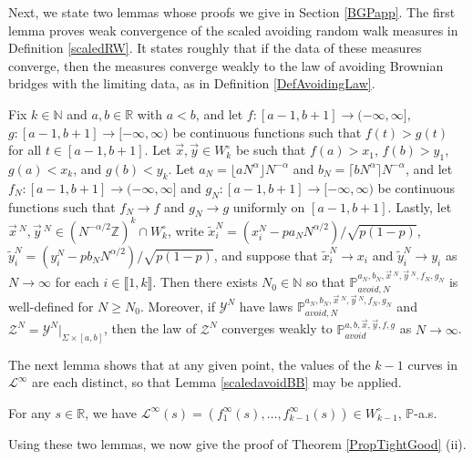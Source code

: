 Next, we state two lemmas whose proofs we give in Section \ref{BGPapp}. The first lemma proves weak convergence of the scaled avoiding random walk measures in Definition \ref{scaledRW}. It states roughly that if the data of these measures converge, then the measures converge weakly to the law of avoiding Brownian bridges with the limiting data, as in Definition \ref{DefAvoidingLaw}.

\begin{lemma}\label{scaledavoidBB}
	Fix $k\in\mathbb{N}$ and $a,b\in\mathbb{R}$ with $a<b$, and let $f:[a-1,b+1]\to(-\infty,\infty]$, $g:[a-1,b+1]\to[-\infty,\infty)$ be continuous functions such that $f(t) > g(t)$ for all $t\in[a-1,b+1]$. Let $\vec{x},\vec{y}\in W_k^\circ$ be such that $f(a) > x_1$, $f(b) > y_1$, $g(a) < x_k$, and $g(b) < y_k$. Let $a_N = \lfloor aN^\alpha\rfloor N^{-\alpha}$ and $b_N = \lceil bN^\alpha\rceil N^{-\alpha}$, and let $f_N : [a-1,b+1]\to(-\infty,\infty]$ and $g_N : [a-1,b+1]\to[-\infty,\infty)$ be continuous functions such that $f_N\to f$ and $g_N\to g$ uniformly on $[a-1,b+1]$. Lastly, let $\vec{x}\,^N, \vec{y}\,^N \in (N^{-\alpha/2}\mathbb{Z})^k \cap W_k^\circ$, write $\tilde{x}^N_i = (x_i^N - pa_N N^{\alpha/2})/\sqrt{p(1-p)}$, $\tilde{y}^N_i = (y_i^N - pb_N N^{\alpha/2})/\sqrt{p(1-p)}$, and suppose that $\tilde{x}^N_i \to x_i$ and $\tilde{y}^N_i \to y_i$ as $N\to\infty$ for each $i\in\llbracket 1,k\rrbracket$. Then there exists $N_0 \in \mathbb{N}$ so that $\mathbb{P}^{a_N,b_N,\vec{x}\,^N,\vec{y}\,^N,f_N,g_N}_{avoid,N}$ is well-defined for $N\geq N_0$. Moreover, if $\mathcal{Y}^N$ have laws $\mathbb{P}^{a_N,b_N,\vec{x}\,^N,\vec{y}\,^N,f_N,g_N}_{avoid,N}$ and $\mathcal{Z}^N = \mathcal{Y}^N|_{\Sigma\times[a,b]}$, then the law of $\mathcal{Z}^N$ converges weakly to $\mathbb{P}^{a,b,\vec{x},\vec{y},f,g}_{avoid}$ as $N\to\infty$.
\end{lemma}

The next lemma shows that at any given point, the values of the $k-1$ curves in $\mathcal{L}^\infty$ are each distinct, so that Lemma \ref{scaledavoidBB} may be applied.

\begin{lemma}\label{inftydistinct}
	For any $s\in\mathbb{R}$, we have $\mathcal{L}^\infty(s) = (f_1^\infty(s),\dots,f_{k-1}^\infty(s)) \in W^\circ_{k-1}$, $\mathbb{P}$-a.s.
\end{lemma}

Using these two lemmas, we now give the proof of Theorem \ref{PropTightGood} (ii).

